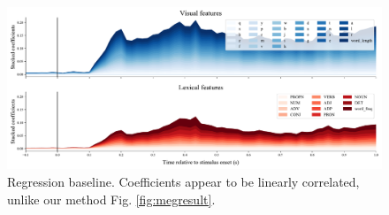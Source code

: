 \begin{figure}
  \centering
  \includegraphics[width=\textwidth, trim=0cm 0cm 0cm 0cm, clip=True]{figures/ridgecv_baseline_result.pdf}
  \caption{Regression baseline. Coefficients appear to be
  linearly correlated, unlike our method Fig. \ref{fig:megresult}.}
  \label{fig:ridgebaselineresult}
\end{figure}
